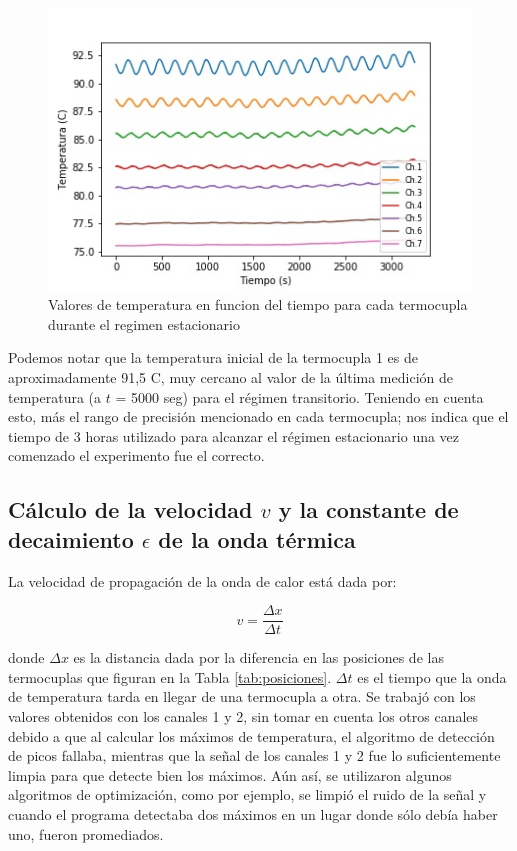 \documentclass[twoside,twocolumn,a4paper]{article}
\begin{document}
\begin{figure}[H]
\includegraphics[width=\linewidth]{Tvst.jpg}
\caption{Valores de temperatura en funcion del tiempo para cada termocupla durante el regimen estacionario}
\label{fig:Tvst_estacionario}
\end{figure}


Podemos notar que la temperatura inicial de la termocupla 1 es de aproximadamente 91,5 \degree C, muy cercano al valor de la \'ultima medici\'on de temperatura (a $t$ = 5000 seg) para el r\'egimen transitorio. Teniendo en cuenta esto, m\'as el rango de precisi\'on mencionado en cada termocupla; nos indica que el tiempo de 3 horas utilizado para alcanzar el r\'egimen estacionario una vez comenzado el experimento fue el correcto.

\subsection{C\'alculo de la velocidad $v$ y la constante de decaimiento $\epsilon$ de la onda t\'ermica}


La velocidad de propagaci\'on de la onda de calor est\'a dada por:

\begin{equation}
\label{eq:velocidad}
v = \frac{\Delta x}{\Delta t}
\end{equation}

donde $\Delta x$ es la distancia dada por la diferencia en las posiciones de las termocuplas que figuran en la Tabla \ref{tab:posiciones}. $\Delta t$ es el tiempo que la onda de temperatura tarda en llegar de una termocupla a otra. Se trabaj\'o con los valores obtenidos con los canales 1 y 2, sin tomar en cuenta los otros canales debido a que al calcular los m\'aximos de temperatura, el algoritmo de detecci\'on de picos fallaba, mientras que la se\~nal de los canales 1 y 2 fue lo suficientemente limpia para que detecte bien los m\'aximos. A\'un as\'i, se utilizaron algunos algoritmos de optimizaci\'on, como por ejemplo, se limpi\'o el ruido de la se\~nal y cuando el programa detectaba dos m\'aximos en un lugar donde s\'olo deb\'ia haber uno, fueron promediados. \newline
\end{document}
